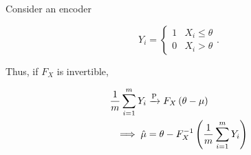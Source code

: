 \documentclass[twoside]{article}
\begin{document}
Consider an encoder

\begin{equation}
    Y_i = 
    \begin{cases}
        1 & X_i \le \theta \\
        0 & X_i > \theta
    \end{cases}.
    \label{eq:onebit-enc}
\end{equation}

Thus, if \(F_X\) is invertible,

\begin{align}
    \frac{1}{m}\sum_{i=1}^mY_i &\xrightarrow{\mathrm{P}} F_X\left(\theta-\mu\right) \\
    \implies \hat{\mu} &= \theta - F_X^{-1}\left(\frac{1}{m}\sum_{i=1}^mY_i\right) 
    \label{eq:mu-est}
\end{align}
\end{document}
